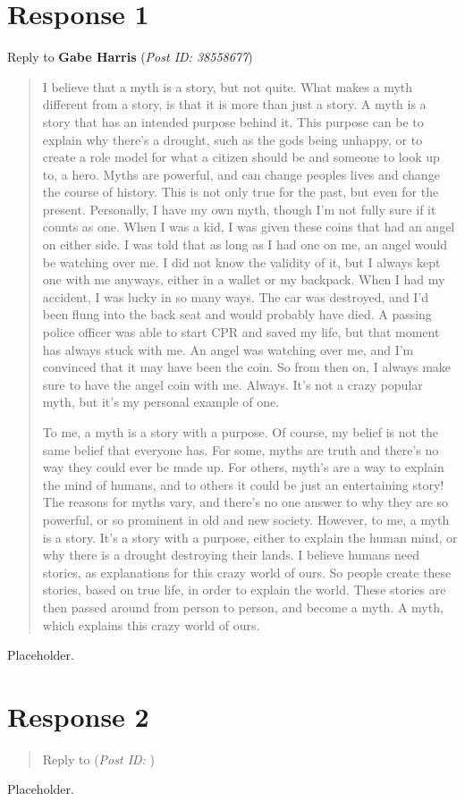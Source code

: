 \documentclass[12pt]{article}
\theoremstyle{definition}
\theoremstyle{plain}
\begin{document}
    \section{Response 1}
      \begin{mdframed}
        Reply to \textbf{Gabe Harris} (\textit{Post ID: 38558677})
      \end{mdframed}
      \begin{quote}
          I believe that a myth is a story, but not quite. What makes a myth different from a
            story, is that it is more than just a story. A myth is a story that has an intended
            purpose behind it. This purpose can be to explain why there’s a drought, such as the
            gods being unhappy, or to create a role model for what a citizen should be and someone
            to look up to, a hero. Myths are powerful, and can change peoples lives and change the
            course of history. This is not only true for the past, but even for the present.
            Personally, I have my own myth, though I’m not fully sure if it counts as one. When I
            was a kid, I was given these coins that had an angel on either side. I was told that as
            long as I had one on me, an angel would be watching over me. I did not know the validity
            of it, but I always kept one with me anyways, either in a wallet or my backpack. When I
            had my accident, I was lucky in so many ways. The car was destroyed, and I’d been flung
            into the back seat and would probably have died. A passing police officer was able to
            start CPR and saved my life, but that moment has always stuck with me. An angel was
            watching over me, and I’m convinced that it may have been the coin. So from then on, I
            always make sure to have the angel coin with me. Always. It’s not a crazy popular myth,
            but it’s my personal example of one.

          To me, a myth is a story with a purpose. Of course, my belief is not the same belief that
            everyone has. For some, myths are truth and there’s no way they could ever be made up.
            For others, myth’s are a way to explain the mind of humans, and to others it could be
            just an entertaining story! The reasons for myths vary, and there’s no one answer to
            why they are so powerful, or so prominent in old and new society. However, to me, a
            myth is a story. It’s a story with a purpose, either to explain the human mind, or why
            there is a drought destroying their lands. I believe humans need stories, as
            explanations for this crazy world of ours. So people create these stories, based on
            true life, in order to explain the world. These stories are then passed around from
            person to person, and become a myth. A myth, which explains this crazy world of ours.
      \end{quote}
      Placeholder.

    \section{Response 2}
      \begin{quote}
        Reply to \textbf{} (\textit{Post ID: }) 
      \end{quote}
      Placeholder.

  \newpage
  \nocite{textbook}
  \printbibliography[
    heading=bibintoc,
    title={Works Cited}
  ]
\end{document}
